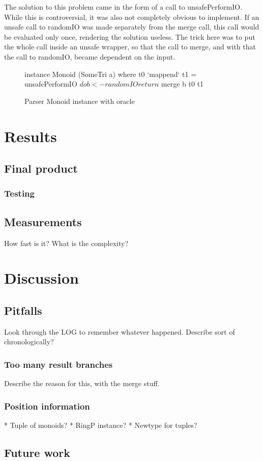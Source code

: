 \documentclass[a4paper,12pt,twosided]{report}
\begin{document}
The solution to this problem came in the form of a call to unsafePerformIO.
While this is controversial, it was also not completely obvious to implement. If
an unsafe call to randomIO was made separately from the merge call, this call
would be evaluated only once, rendering the solution useless. The trick here was
to put the whole call inside an unsafe wrapper, so that the call to merge, and
with that the call to randomIO, became dependent on the input.
\begin{figure}
\begin{code}
instance Monoid (SomeTri a) where
    t0 `mappend` t1 = unsafePerformIO $ do
      b <- randomIO
      return $ merge b t0 t1
\end{code}
\caption{Parser Monoid instance with oracle}
\end{figure}

%
%

\chapter{Results}

\section{Final product}
\subsection{Testing}

\section{Measurements}
How fast is it? What is the complexity?

%
%
\chapter{Discussion}

\section{Pitfalls}
Look through the LOG to remember whatever happened. Describe sort of chronologically?

\subsection{Too many result branches}
Describe the reason for this, with the merge stuff.

\subsection{Position information}
* Tuple of monoids?
* RingP instance?
* Newtype for tuples?

\section{Future work}

%
%




%
%
\end{document}
